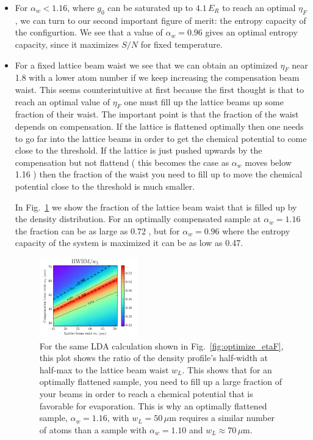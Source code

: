 \documentclass[11pt,letter]{article}
\newcommand{\awaist}{\ensuremath{ \alpha_{w} }}
\begin{document}
\begin{itemize}
\item For $\awaist < 1.16$, where $g_{0}$ can be saturated up to $4.1\,E_{R}$
to reach an optimal $\eta_{F}$, we can turn to our second important figure of
merit:  the entropy capacity of the configurtion.   We see that a value of
$\awaist=0.96$ gives an optimal entropy capacity, since it maximizes $S/N$ for
fixed temperature.   

\item For a fixed lattice beam waist we see that we can obtain an optimized
$\eta_{F}$  near 1.8 with a lower atom number if we keep increasing the
compensation beam waist.   This seems counterintuitive at first because the
first thought is that to reach an optimal value of $\eta_{F}$ one must fill up
the lattice beams up some fraction of their waist.    The important point is
that the fraction of the waist depends on compensation.  If the lattice is
flattened optimally then one needs to go far into the lattice beams in order to
get the chemical potential to come close to the threshold.  If the lattice is
just pushed upwards by the compensation but not flattend ( this becomes the
case as $\awaist$ moves below 1.16 ) then the fraction of the waist you need to
fill up to move the chemical potential close to the threshold is much smaller.  
 
In Fig.~\ref{fig:optimize_etaF_hwhm} we show the fraction of the lattice beam
waist that is filled up by the density distribution.  For an optimally
compensated sample at $\awaist=1.16$ the fraction can be as large as 0.72 , but
for $\awaist=0.96$ where the entropy capacity of the system is maximized it can
be as low as 0.47.  

\begin{figure}
    \centering
\includegraphics[width=0.4\textwidth]{figures_hubbard-lda/etaF-HWHM-ratio.png}
\caption{For the same LDA calculation shown in Fig.~\ref{fig:optimize_etaF},
this plot shows the ratio of the density profile's half-width at half-max to
the lattice beam waist $w_{L}$.  This shows that for an optimally  flattened
sample, you need to fill up a large fraction of your beams in order to reach a
chemical potential that is favorable for evaporation.   This is why an
optimally flattened sample, $\awaist=1.16$, with  $w_{L}=50\,\mu\mathrm{m}$
requires a similar number of atoms than a sample with $\awaist=1.10$ and
$w_{L}\approx 70\,\mu\mathrm{m}$.}
    \label{fig:optimize_etaF_hwhm}
\end{figure}


\end{itemize}
\end{document}
